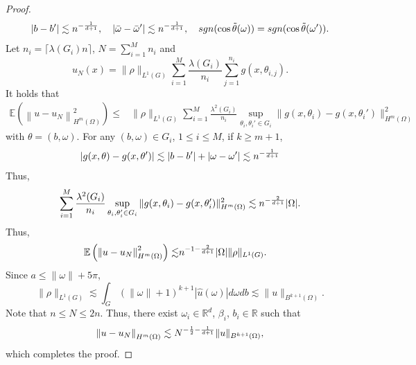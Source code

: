 \begin{proof}
\begin{equation}
|b-b'|\lesssim n^{-{1\over d+1}},\quad |\bar\omega - \bar\omega'|\lesssim  n^{-{1\over d+1}}, \quad sgn(\cos \tilde\theta(\omega))=sgn(\cos\tilde \theta(\omega')).
\end{equation} 
Let $n_i=\lceil \lambda(G_i)n\rceil$, $N=\displaystyle \sum_{i=1}^M n_i$ and
\begin{equation}
u_{N}(x)=\|\rho\|_{L^1(G)}\sum_{i=1}^{M} \frac{\lambda(G_{i})}{n_{i}} \sum_{j=1}^{n_{i}}g(x,\theta_{i,j}).
\end{equation}
It holds that
\begin{equation}\label{eq:sum}
\begin{split}
\mathbb{E}\left(\left\|u - u_{N}\right\|_{H^{m}(\Omega)}^{2}\right)\le&
\|\rho\|_{L^1(G)}\sum_{i=1}^{M}  \frac{\lambda^2(G_i)}{n_{i}}  \sup_{\theta_{i},\theta_{i}'\in G_i} \| g(x,\theta_i) - g(x,\theta_i')\|^2_{H^m(\Omega)}
 \end{split}
\end{equation}
with $\theta=(b, \omega)$. 
For any $(b, \omega)\in G_i$, $1\le i\le M$, if $k\ge m+1$,
\begin{equation}
|g(x,\theta) - g(x,\theta')| \lesssim |b-b'| + |\omega - \omega'| \lesssim   n^{-{1\over d+1}}
\end{equation}
Thus,
\begin{equation}
 \sum_{i=1}^{M}  \frac{\lambda^2(G_i)}{n_{i}}  \sup_{\theta_{i},\theta_{i}'\in G_i} \| g(x,\theta_i) - g(x,\theta_i')\|^2_{H^m(\Omega)}  
 \lesssim  n^{-{2\over d+1}} |\Omega|.
\end{equation}
Thus,
\begin{equation}\label{eq:}
\begin{split}
\mathbb{E}\left(\left\|u - u_{N}\right\|_{H^{m}(\Omega)}^{2}\right)\lesssim&   n^{-1-{2\over d+1}} |\Omega|\|\rho\|_{L^1(G)}.
 \end{split}
\end{equation}
Since $a\le \|\omega\|+5\pi$, 
$$
\|\rho\|_{L^1(G)}\lesssim \int_G (\|\omega\| + 1)^{k+1}|\hat u(\omega)|d\omega db \lesssim \|u\|_{B^{k+1}(\Omega)}.
$$
Note that $n\le N\le 2n$. Thus, there exist $\omega_i\in \mathbb{R}^d$, $\beta_i$, $b_i\in \mathbb{R}$ such that
\begin{equation}
\left\|u - u_{N}\right\|_{H^{m}(\Omega)}\lesssim  N^{-{1\over 2}-{1\over d+1}} \|u\|_{B^{k+1}(\Omega)},
\end{equation}
which completes the proof.
\end{proof}

